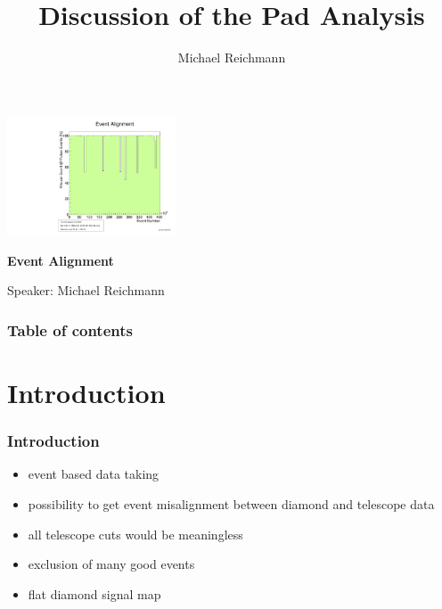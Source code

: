 \documentclass[9pt]{beamer}
\title[Analysis]{Discussion of the Pad Analysis}
\author[M. Reichmann]{Michael Reichmann}
\institute[\textbf{\textit{ETH}}\scalebox{.6}{\textit{Z\"{u}rich}}]{Swiss Federal Institute of Technology Zurich}
\begin{document}
\begin{frame}
	\begin{center}
		\includegraphics[angle=270, width=5cm]{EventAlignment429}
	\end{center}
	\begin{alertblock}{
		\begin{center}
			\textbf{Event Alignment}
		\end{center}}
		\vspace*{10pt}
		\begin{center}\small
		Speaker: Michael Reichmann
		\end{center}\normalsize
	\end{alertblock}
\end{frame}
\begin{frame}[allowframebreaks]
	\frametitle{Table of contents}
	\tableofcontents   %
\end{frame}
\section{Introduction}
\begin{frame}
	\frametitle{Introduction}
	\begin{minipage}[c][.5\textheight]{\textwidth}
		\begin{itemize}
			\setlength{\itemsep}{\fill}
			\item event based data taking
			\item possibility to get event misalignment between diamond and telescope data
			\item all telescope cuts would be meaningless
			\item exclusion of many good events
			\item flat diamond signal map
		\end{itemize}
	\end{minipage}
\end{frame}
\end{document}
